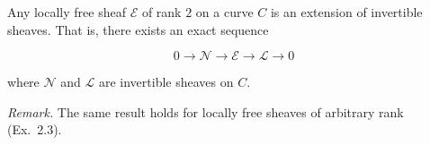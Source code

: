 Any locally free sheaf $\mathcal{E}$ of rank $2$ on a curve $C$ is an extension of invertible sheaves. That is, there exists an exact sequence

$$0 \rightarrow \mathcal{N} \rightarrow \mathcal{E} \rightarrow \mathcal{L} \rightarrow 0$$

where $\mathcal{N}$ and $\mathcal{L}$ are invertible sheaves on $C$.

\textit{Remark.} The same result holds for locally free sheaves of arbitrary rank (Ex.~2.3).
